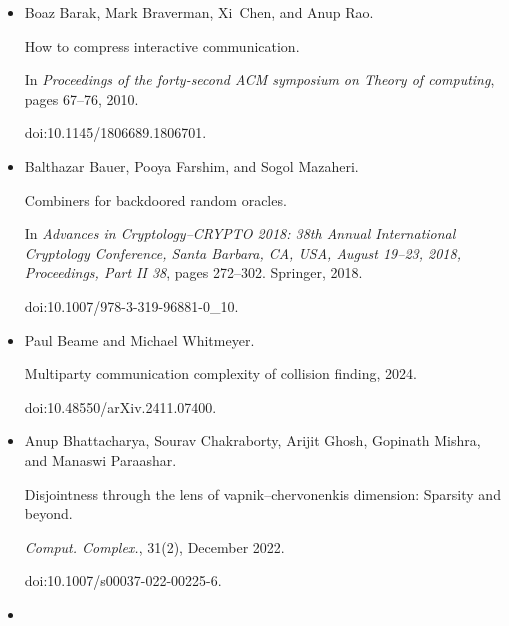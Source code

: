 \begin{itemize}
\emph{Journal of Computer and System Sciences}, 68(4):702–732, 2004.


doi:10.1016/J.JCSS.2003.11.006.





\item[] 
[6]

Boaz Barak, Mark Braverman, Xi Chen, and Anup Rao.


How to compress interactive communication.


In \emph{Proceedings of the forty-second ACM symposium on Theory of
computing}, pages 67–76, 2010.


doi:10.1145/1806689.1806701.





\item[] 
[7]

Balthazar Bauer, Pooya Farshim, and Sogol Mazaheri.


Combiners for backdoored random oracles.


In \emph{Advances in Cryptology–CRYPTO 2018: 38th Annual
International Cryptology Conference, Santa Barbara, CA, USA, August 19–23,
2018, Proceedings, Part II 38}, pages 272–302. Springer, 2018.


doi:10.1007/978-3-319-96881-0\_10.





\item[] 
[8]

Paul Beame and Michael Whitmeyer.


Multiparty communication complexity of collision finding, 2024.


doi:10.48550/arXiv.2411.07400.





\item[] 
[9]

Anup Bhattacharya, Sourav Chakraborty, Arijit Ghosh, Gopinath Mishra, and
Manaswi Paraashar.


Disjointness through the lens of vapnik–chervonenkis dimension:
Sparsity and beyond.


\emph{Comput. Complex.}, 31(2), December 2022.


doi:10.1007/s00037-022-00225-6.





\item[] 
[10]


\end{itemize}
